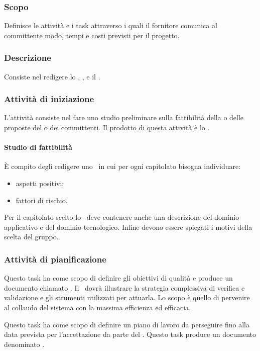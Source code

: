 \documentclass[12pt,a4paper]{article}
\begin{document}
\subsubsection{Scopo}
Definisce le attività e i task attraverso i quali il fornitore comunica al committente modo, tempi e costi previsti per il progetto.

\subsubsection{Descrizione}
Consiste nel redigere lo \SdF, \PdQ, e il \PdP.

\subsubsection{Attività di iniziazione}
L'attività consiste nel fare uno studio preliminare sulla fattibilità della o delle proposte del o dei committenti. Il prodotto di questa attività è lo \SdF.

\paragraph{Studio di fattibilità}
È compito degli \ANpl{} redigere uno \SdF\ in cui per ogni capitolato bisogna individuare:
\begin{itemize}
	\item aspetti positivi;
	\item fattori di rischio.
\end{itemize}
Per il capitolato scelto lo \SdF\ deve contenere anche una descrizione del dominio applicativo e del dominio tecnologico. Infine devono essere spiegati i motivi della scelta del gruppo.

\subsubsection{Attività di pianificazione}

Questo task ha come scopo di definire gli obiettivi di qualità e produce un documento chiamato \PdQ. Il \PdQ\ dovrà illustrare la strategia complessiva di verifica e validazione e gli strumenti utilizzati per attuarla. Lo scopo è quello di pervenire al collaudo del sistema con la massima efficienza ed efficacia.

Questo task ha come scopo di definire un piano di lavoro da perseguire fino alla data prevista per l'accettazione da parte del . Questo task produce un documento denominato \PdP.
\end{document}
